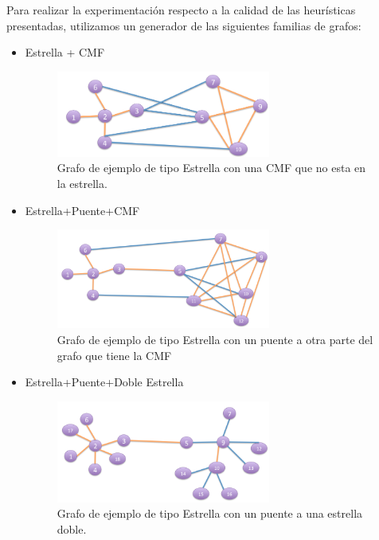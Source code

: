 
Para realizar la experimentación respecto a la calidad de las heurísticas presentadas, utilizamos un generador de las siguientes familias de grafos:
\begin{itemize}
\item Estrella + CMF
 \begin{figure}[H] %
\begin{center}
\includegraphics[width=200pt]{../imgs/Estrella+CMF.jpg}
\caption{Grafo de ejemplo de tipo Estrella con una CMF que no esta en la estrella.}
\end{center}
\end{figure}
\item Estrella+Puente+CMF
 \begin{figure}[H] %
\begin{center}
\includegraphics[width=200pt]{../imgs/Estrella+Puente+CMF.jpg}
\caption{Grafo de ejemplo de tipo Estrella con un puente a otra parte del grafo que tiene la CMF}
\end{center}
\end{figure}
\item Estrella+Puente+Doble Estrella
 \begin{figure}[H] %
\begin{center}
\includegraphics[width=200pt]{../imgs/Estrella+puente+dobleEstrella.jpg}
\caption{Grafo de ejemplo de tipo Estrella con un puente a una estrella doble.}
\end{center}
\end{figure}


\end{itemize}
